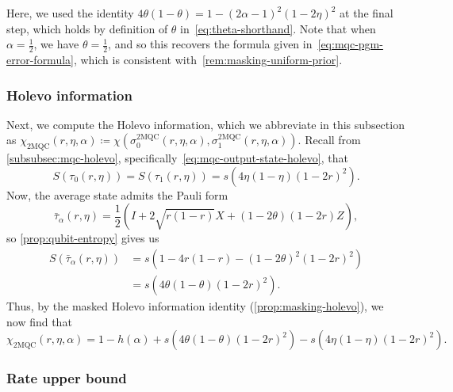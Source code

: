 \documentclass[11pt]{article}
\theoremstyle{remark}
\newcommand{\mMQC}{2\mathrm{MQC}}
\begin{document}
Here, we used the identity $4\theta(1-\theta) = 1-(2\alpha-1)^2(1-2\eta)^2$ at the final step, which holds by definition of $\theta$ in~\eqref{eq:theta-shorthand}. Note that when $\alpha = \frac{1}{2}$, we have $\theta = \frac{1}{2}$, and so this recovers the formula given in~\cref{eq:mqc-pgm-error-formula}, which is consistent with~\cref{rem:masking-uniform-prior}.

\subsubsection{Holevo information}
\label{subsubsec:2mqc-holevo}

Next, we compute the Holevo information, which we abbreviate in this subsection as $\chi_{\mMQC}(r,\eta,\alpha) \coloneqq \chi(\sigma_0^{\mMQC}(r,\eta,\alpha),\sigma_1^{\mMQC}(r,\eta,\alpha))$. Recall from \cref{subsubsec:mqc-holevo}, specifically~\eqref{eq:mqc-output-state-holevo}, that
\begin{equation*}
S(\tau_0(r,\eta)) = S(\tau_1(r,\eta)) = s\left(4\eta(1-\eta)(1-2r)^2\right).
\end{equation*}
Now, the average state admits the Pauli form
\begin{equation*}
\bar{\tau}_\alpha(r,\eta)
=\frac{1}{2}\left(I+2\sqrt{r(1-r)}X
+(1-2\theta)(1-2r)Z\right),
\end{equation*}
so \cref{prop:qubit-entropy} gives us
\begin{align*}
S(\bar{\tau}_\alpha(r,\eta))
&= s\left(1-4r(1-r)-(1-2\theta)^2(1-2r)^2\right) \\
&= s\left(4\theta(1-\theta)(1-2r)^2\right).
\end{align*}
Thus, by the masked Holevo information identity (\cref{prop:masking-holevo}), we now find that
\begin{equation}
\label{eq:2mqc-holevo}
\chi_{\mMQC}(r,\eta,\alpha)
= 1-h(\alpha)
+s\left(4\theta(1-\theta)(1-2r)^2\right) - s\left(4\eta(1-\eta)(1-2r)^2\right).
\end{equation}

\subsubsection{Rate upper bound}
\label{subsubsec:2mqc-rate}
\end{document}
